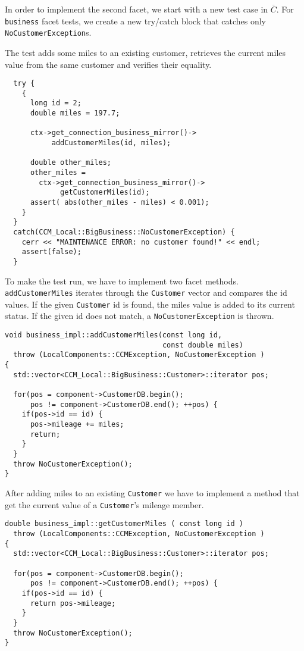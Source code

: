 In order to implement the second facet, we start with a new test case in 
$\overline{C}$.
For {\tt business} facet tests, we create a new try/catch block that catches
only {\tt NoCustomerException}s.
 
The test adds some miles to an existing customer, retrieves the current miles 
value from the same customer and verifies their equality. 

\begin{small}
\begin{verbatim}
  try {
    {
      long id = 2;
      double miles = 197.7;

      ctx->get_connection_business_mirror()->
           addCustomerMiles(id, miles); 

      double other_miles;
      other_miles = 
        ctx->get_connection_business_mirror()->
             getCustomerMiles(id); 
      assert( abs(other_miles - miles) < 0.001);
    }
  }
  catch(CCM_Local::BigBusiness::NoCustomerException) {
    cerr << "MAINTENANCE ERROR: no customer found!" << endl;
    assert(false);
  }
\end{verbatim}
\end{small}


To make the test run, we have to implement two facet methods.
{\tt addCustomerMiles} iterates through the {\tt Customer} vector
and compares the id values.
If the given {\tt Customer} id is found, the miles value is added to
its current status.
If the given id does not match, a {\tt NoCustomerException} is thrown.
\begin{small}
\begin{verbatim}
void business_impl::addCustomerMiles(const long id, 
                                     const double miles)
  throw (LocalComponents::CCMException, NoCustomerException )
{
  std::vector<CCM_Local::BigBusiness::Customer>::iterator pos;

  for(pos = component->CustomerDB.begin(); 
      pos != component->CustomerDB.end(); ++pos) {
    if(pos->id == id) {
      pos->mileage += miles;
      return;
    }
  }
  throw NoCustomerException();    
}
\end{verbatim}
\end{small}

After adding miles to an existing {\tt Customer} we have to implement a method
that get the current value of a {\tt Customer}'s mileage member.

\begin{small}
\begin{verbatim}
double business_impl::getCustomerMiles ( const long id )
  throw (LocalComponents::CCMException, NoCustomerException )
{
  std::vector<CCM_Local::BigBusiness::Customer>::iterator pos;

  for(pos = component->CustomerDB.begin(); 
      pos != component->CustomerDB.end(); ++pos) {
    if(pos->id == id) {
      return pos->mileage;
    }
  }
  throw NoCustomerException(); 
}
\end{verbatim}
\end{small}

